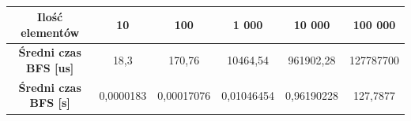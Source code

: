 \documentclass[11pt,a4paper]{article}
\begin{document}
\begin{table}[htbp]
\caption{}
\begin{center}
\begin{tabular}{|c|c|c|c|c|c|}
\hline
\textbf{Ilość elementów} & \textbf{10} & \textbf{100} & \textbf{1 000} & \textbf{10 000} & \textbf{100 000} \\ \hline
\textbf{Średni czas BFS [us]} & 18,3 & 170,76 & 10464,54 & 961902,28 & 127787700 \\ \hline
\textbf{Średni czas BFS [s]} & 0,0000183 & 0,00017076 & 0,01046454 & 0,96190228 & 127,7877 \\ \hline
\end{tabular}
\end{center}
\label{bfs_sredni}
\end{table}
\end{document}
